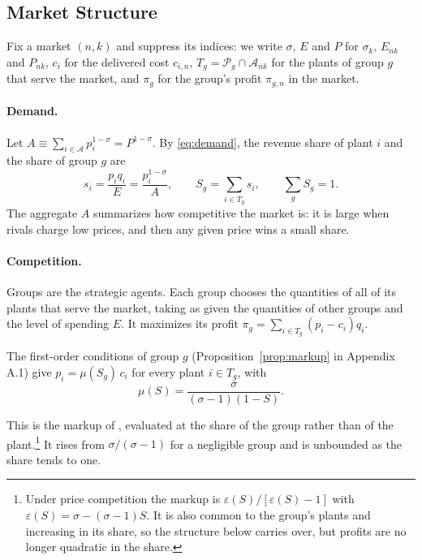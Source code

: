 \documentclass[11pt]{article}
\newcommand{\cP}{\mathcal P}
\newcommand{\cA}{\mathcal A}
\begin{document}
\subsection{Market Structure}
\label{sec:market}

Fix a market $(n,k)$ and suppress its indices: we write $\sigma$, $E$ and $P$ for
$\sigma_k$, $E_{nk}$ and $P_{nk}$, $c_i$ for the delivered cost $c_{i,n}$,
$T_g=\cP_g\cap\cA_{nk}$ for the plants of group $g$ that serve the market, and $\pi_g$ for the group's profit
$\pi_{g,n}$ in the market.

\paragraph{Demand.} Let $A\equiv\sum_{i\in\cA}p_i^{1-\sigma}=P^{1-\sigma}$. By
\eqref{eq:demand}, the revenue share of plant $i$ and the share of group $g$ are
\begin{equation}
  s_i=\frac{p_iq_i}{E}=\frac{p_i^{1-\sigma}}{A},
  \qquad
  S_g=\sum_{i\in T_g}s_i,
  \qquad
  \sum_g S_g=1 .
  \label{eq:shares}
\end{equation}
The aggregate $A$ summarizes how competitive the market is: it is large when rivals
charge low prices, and then any given price wins a small share.

\paragraph{Competition.} Groups are the strategic agents. Each group chooses the
quantities of all of its plants that serve the market, taking as given the quantities
of other groups and the level of spending $E$. It maximizes its profit
$\pi_g=\sum_{i\in T_g}(p_i-c_i)q_i$.

The first-order conditions of group $g$ (Proposition~\ref{prop:markup} in Appendix A.1)
give $p_i=\mu(S_g)\,c_i$ for every plant $i\in T_g$, with
\begin{equation}
  \mu(S)=\frac{\sigma}{(\sigma-1)(1-S)} .
  \label{eq:markup}
\end{equation}

\noindent This is the markup of \citet{AtkesonBurstein2008}, evaluated at the share
of the group rather than of the plant.\footnote{Under price competition the markup is
$\varepsilon(S)/[\varepsilon(S)-1]$ with $\varepsilon(S)=\sigma-(\sigma-1)S$. It is also
common to the group's plants and increasing in its share, so the structure below
carries over, but profits are no longer quadratic in the share.} It rises from $\sigma/(\sigma-1)$ for
a negligible group and is unbounded as the share tends to one.
\end{document}
